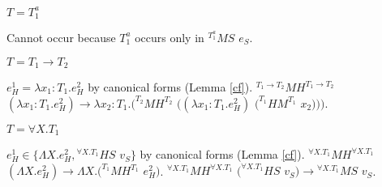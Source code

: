\begin{case}
\begin{subcase}

$T=T_{1}^{a}$

Cannot occur because $T_{1}^{a}$ occurs only in $^{T_{1}^{a}}MS$ $e_{S}$.

\end{subcase}

\begin{subcase}

$T=T_{1}\rightarrow T_{2}$

$e_{H}^{1}=\lambda x_{1}:T_{1}.e_{H}^{2}$ by canonical forms (Lemma \ref{cf}).  $^{T_{1}\rightarrow T_{2}}MH^{T_{1}\rightarrow T_{2}}$ $(\lambda x_{1}:T_{1}.e_{H}^{2})\rightarrow\lambda x_{2}:T_{1}.(^{T_{2}}MH^{T_{2}}$ $((\lambda x_{1}:T_{1}.e_{H}^{2})$ $(^{T_{1}}HM^{T_{1}}$ $x_{2})))$.

\end{subcase}

\begin{subcase}

$T=\forall X.T_{1}$

$e_{H}^{1}\in\lbrace\Lambda X.e_{H}^{2},{^{\forall X.T_{1}}H}S$ $v_{S}\rbrace$ by canonical forms (Lemma \ref{cf}).  $^{\forall X.T_{1}}MH^{\forall X.T_{1}}$ $(\Lambda X.e_{H}^{2})\rightarrow\Lambda X.(^{T_{1}}MH^{T_{1}}$ $e_{H}^{2})$.  $^{\forall X.T_{1}}MH^{\forall X.T_{1}}$ $(^{\forall X.T_{1}}HS$ $v_{S})\rightarrow{^{\forall X.T_{1}}M}S$ $v_{S}$.

\end{subcase}

\end{case}